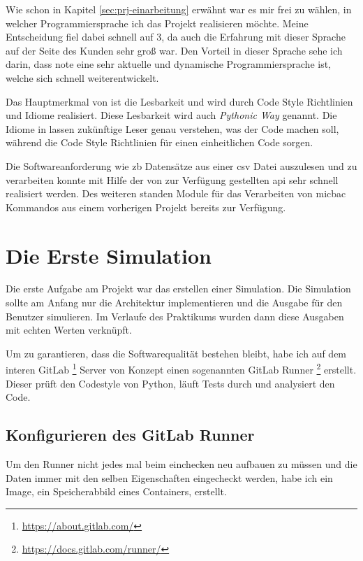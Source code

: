 Wie schon in Kapitel \ref{sec:prj-einarbeitung} erwähnt war es mir frei zu wählen, in welcher
Programmiersprache ich das Projekt realisieren möchte. Meine Entscheidung fiel dabei schnell
auf  3, da auch die Erfahrung mit dieser Sprache auf der Seite des 
Kunden sehr groß war. Den Vorteil in dieser Sprache sehe ich darin, dass 
{note} eine sehr aktuelle und dynamische Programmiersprache ist, welche sich schnell 
weiterentwickelt. 

Das Hauptmerkmal von  ist die Lesbarkeit und wird durch Code Style 
Richtlinien und Idiome realisiert. Diese Lesbarkeit wird auch \textit{Pythonic Way} genannt. 
Die Idiome in  lassen zukünftige Leser genau verstehen, was der Code 
machen soll, während die Code Style Richtlinien für einen einheitlichen Code sorgen.

Die Softwareanforderung wie \ac{zb} Datensätze aus einer \ac{csv} Datei auszulesen und zu 
verarbeiten konnte mit Hilfe der von  zur Verfügung gestellten \ac{api} 
sehr schnell realisiert werden. Des weiteren standen  Module für das 
Verarbeiten von \ac{micbac} Kommandos aus einem vorherigen Projekt bereits zur Verfügung.


\section{Die Erste Simulation}
\label{sec:first_simulation}

Die erste Aufgabe am Projekt war das erstellen einer Simulation. Die Simulation sollte am 
Anfang nur die Architektur implementieren und die Ausgabe für den Benutzer simulieren. Im 
Verlaufe des Praktikums wurden dann diese Ausgaben mit echten Werten verknüpft.

Um zu garantieren, dass die Softwarequalität bestehen bleibt, habe ich auf dem interen GitLab
\footnote{\url{https://about.gitlab.com/}} Server von Konzept einen sogenannten GitLab Runner
\footnote{\url{https://docs.gitlab.com/runner/}} erstellt. Dieser prüft den Codestyle von Python, läuft Tests durch und analysiert den Code.


\subsection{Konfigurieren des GitLab Runner}
\label{subsec:gitlab_runner}

Um den Runner nicht jedes mal beim einchecken neu aufbauen zu müssen und die Daten immer mit 
den selben Eigenschaften eingecheckt werden, habe ich ein  Image, ein 
Speicherabbild eines Containers, erstellt.

